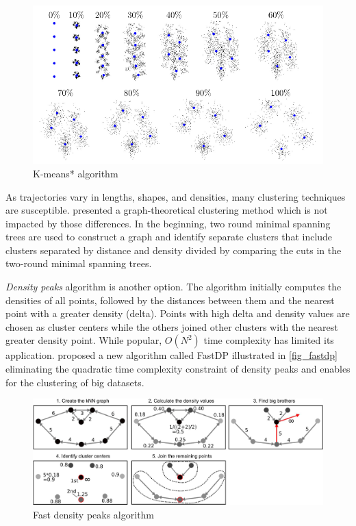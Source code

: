 \documentclass[a4paper, 12pt]{article}
\begin{document}
\begin{figure}[htbp!]
    \centering
    \includegraphics[width=1\textwidth]{gradual_algorithm.png}
    \caption{K-means* algorithm \citep{malinen2014k}}
    \label{fig_gradual}
\end{figure}

As trajectories vary in lengths, shapes, and densities, many clustering techniques are susceptible. \citet{zhong2010graph} presented a graph-theoretical clustering method which is not impacted by those differences. In the beginning, two round minimal spanning trees are used to construct a graph and identify separate clusters that include clusters separated by distance and density divided by comparing the cuts in the two-round minimal spanning trees.

\textit{Density peaks} algorithm \citep{rodriguez2014clustering} is another option. The algorithm initially computes the densities of all points, followed by the distances between them and the nearest point with a greater density (delta). Points with high delta and density values are chosen as cluster centers while the others joined other clusters with the nearest greater density point. While popular, $O(N^2)$ time complexity has limited its application. \citet{sieranoja2019fast} proposed a new algorithm called FastDP illustrated in \autoref{fig_fastdp} eliminating the quadratic time complexity constraint of density peaks and enables for the clustering of big datasets.

\begin{figure}[htbp!]
    \centering
    \includegraphics[width=1\textwidth]{fast_density_peak.jpg}
    \caption{Fast density peaks algorithm \citep{sieranoja2019fast}}
    \label{fig_fastdp}
\end{figure}
\end{document}
